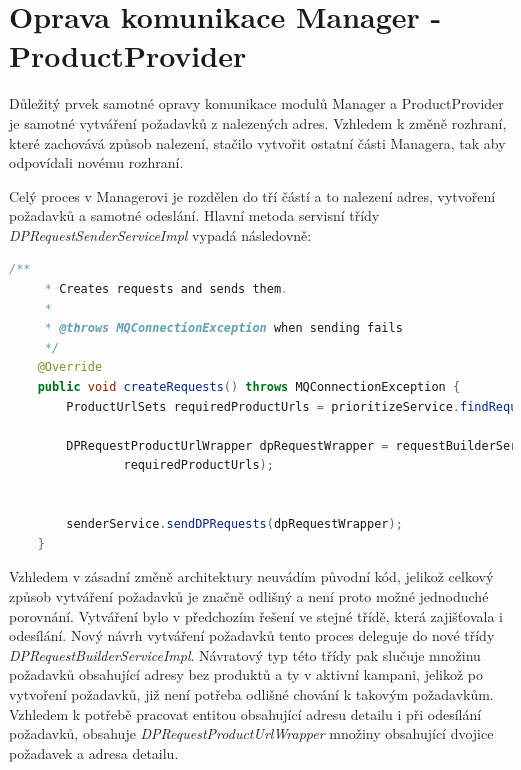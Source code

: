 \documentclass[thesis=B,czech]{FITthesis}[2012/06/26]
\begin{document}
\section{Oprava komunikace Manager - ProductProvider}
Důležitý prvek samotné opravy komunikace modulů Manager a ProductProvider je samotné vytváření požadavků z nalezených adres.
Vzhledem k změně rozhraní, které zachovává způsob nalezení, stačilo vytvořit ostatní části Managera, tak aby odpovídali novému rozhraní.
\par
Celý proces v Managerovi je rozdělen do tří částí a to nalezení adres, vytvoření požadavků a samotné odeslání. Hlavní metoda servisní třídy \textit{DPRequestSenderServiceImpl} vypadá následovně:
\begin{lstlisting}[language=Java]
    /**
     * Creates requests and sends them.
     *
     * @throws MQConnectionException when sending fails
     */
    @Override
    public void createRequests() throws MQConnectionException {
        ProductUrlSets requiredProductUrls = prioritizeService.findRequiredProductUrls();

        DPRequestProductUrlWrapper dpRequestWrapper = requestBuilderService.create(
                requiredProductUrls);


        senderService.sendDPRequests(dpRequestWrapper);
    }
\end{lstlisting}
Vzhledem v zásadní změně architektury neuvádím původní kód, jelikož celkový způsob vytváření požadavků je značně odlišný a není proto možné jednoduché porovnání. Vytváření bylo v předchozím řešení ve stejné třídě, která zajišťovala i odesílání. Nový návrh vytváření požadavků tento proces deleguje do nové 
třídy \textit{DPRequestBuilderServiceImpl}. Návratový typ této třídy pak slučuje množinu požadavků obsahující adresy bez produktů a 
ty v aktivní kampani, jelikož po vytvoření požadavků, již není potřeba odlišné chování k takovým požadavkům. Vzhledem k potřebě 
pracovat entitou obsahující adresu detailu i při odesílání požadavků, obsahuje \textit{DPRequestProductUrlWrapper}
množiny obsahující dvojice požadavek a adresa detailu.
\end{document}

